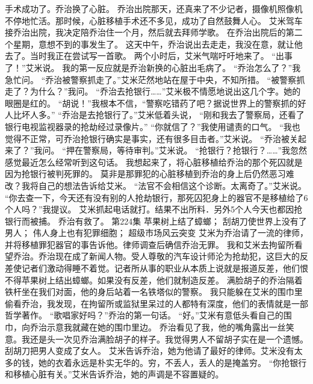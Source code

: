 \documentclass[a4paper,12pt,UTF8,twoside]{ctexbook}
\begin{document}
        手术成功了。乔治换了心脏。 
        乔治出院那天，还真来了不少记者，摄像机照像机不停地忙活。那时候，心脏移植手术还不多见，成功了自然鼓舞人心。 
        艾米驾车接乔治出院，我决定陪乔治住一个月，然后就去拜师学歌。 
        在乔治出院后的第二个星期，意想不到的事发生了。 
        这天中午，乔治说出去走走，我没在意，就让他去了。当时我正在尝试写一首歌。 
        两个小时后，艾米气喘吁吁地来了。 
        “出事了！”艾米说。 
        我的第一反应就是乔治新换的心脏出毛病了。 
        “乔治怎么了？”我急忙问。 
        “乔治被警察抓走了。”艾米茫然地站在屋于中央，不知所措。 
        “被警察抓走了？为什么？”我问。 
        “乔治去抢银行……”艾米极不情愿地说出这几个字。她的眼圈是红的。 
        “胡说！”我根本不信，“警察吃错药了吧？据说世界上的警察抓的好人比坏人多。” 
        “乔治是去抢银行了。”艾米低着头说，  “刚和我去了警察局，还看了银行电视监视器录的抢劫经过录像片。” 
        “你就信了？”我使用谴责的口气。 
        “我也觉得不正常，可乔治抢银行确实是事实，还有很多目击者。”艾米说。 
        “乔治被关起来了？”我问。 
        “押在警察局，等待审判。”艾米说。 
        “抢银行？抢银行？……”我忽然感觉最近怎么经常听到这句话。 
        我想起来了，将心脏移植给乔治的那个死囚就是因为抢银行被判死罪的。 
        莫非是那罪犯的心脏移植到乔治的身上后仍然恶习难改？我将自己的想法告诉给艾米。 
        “法官不会相信这个诊断。太离奇了。”艾米说。 
        “你去查一下，今天还有没有别的人抢劫银行，那死囚犯身上的器官不是移植给了6个人吗？”我提议。 
        艾米抓起电话就打。结果不出所料．另外5个人今天也都因抢银行而被捕。 
        乔治有救了。   第224集 
        苹果树上结了蟑螂； 
        刮胡刀使世界上没有了男人； 
        伟人身上也有犯罪细胞； 
        超级市场风云突变   
        艾米为乔治请了一流的律师，并将移植罪犯器官的事告诉他。律师调查后确信乔治无罪。 
        我和艾米去拘留所看望乔治。乔治现在成了新闻人物。受人尊敬的汽车设计师沦为抢劫犯，这巨大的反差使记者们激动得睡不着觉。记者所从事的职业从本质上说就是报道反差，他们恨不得苹果树上结出蟑螂。如果没有反差，他们就制造反差。 
        满脸胡子的乔治隔着铁杆坐在我们对面，他的身后站着一名铁塔似的警察。 
        我只能躲在艾米的围巾里偷看乔治，我发现，在拘留所或监狱里呆过的人都特有深度，他们的表情就是一部哲学著作。 
        “歌唱家好吗？”乔治的第一句话。 
        “好。”艾米有意低头看自己的围巾，向乔治示意我就藏在她的围巾里边。 
        乔治看见了我，他的嘴角露出一丝笑意。我还是头一次见乔治满脸胡子的样子。我觉得男人不留胡子实在是一个遗憾。刮胡刀把男人变成了女人。 
        艾米告诉乔治，她为他请了最好的律师。艾米没有太多的钱，她的衣着永远是朴实无华的。穷，不丢人，丢人的是掩盖穷。 
        “你抢银行和移植心脏有关。”艾米告诉乔治，她的声调是不容置疑的。 
\end{document}
